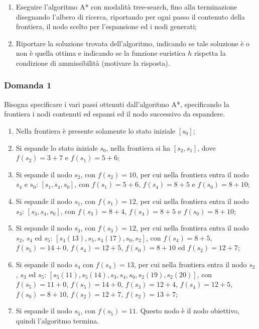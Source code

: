 \documentclass{article}
\numberwithin{equation}{section}
\begin{document}
\begin{enumerate}
    \item Eseguire l'algoritmo A* con modalità tree-search, fino alla terminazione disegnando l'albero di ricerca, riportando per ogni passo il 
contenuto della frontiera, il nodo scelto per l'espansione ed i nodi generati;
    \item Riportare la soluzione trovata dell'algoritmo, indicando se tale soluzione è o non è quella ottima e indicando se la funzione euristica 
$h$ rispetta la condizione di ammissibilità (motivare la risposta). 
\end{enumerate}

\subsubsection*{Domanda 1}

Bisogna specificare i vari passi ottenuti dall'algoritmo A*, specificando la frontiera i nodi contenuti ed espansi ed il nodo successivo 
da espandere.

\begin{enumerate}
    \item Nella frontiera è presente solamente lo stato iniziale $[s_0]$;
    \item Si espande lo stato iniziale $s_0$, nella frontiera si ha $[s_2,s_1]$, dove $f(s_2)=3+7$ e $f(s_1)=5+6$;
    \item Si espande il nodo $s_2$, con $f(s_2)=10$, per cui nella frontiera entra il nodo $s_4$ e $s_0$: $[s_1,s_4, s_0]$, con $f(s_1)=5+6$, $f(s_4)=8+5$ e $f(s_0)=8+10$;
    \item Si espande il nodo $s_1$, con $f(s_1)=12$, per cui nella frontiera entra il nodo $s_3$: $[s_3, s_4, s_0]$, con $f(s_3)=8+4$, $f(s_4)=8+5$ e $f(s_0)=8+10$;
    \item Si espande il nodo $s_3$, con $f(s_3)=12$, per cui nella frontiera entra il nodo $s_2$, $s_4$ ed $s_5$: $[s_4(13), s_5, s_4(17), s_0, s_2]$, con $f(s_4)=8+5$, $f(s_5)=14+0$, $f(s_4)=12+5$, $f(s_0)=8+10$ ed $f(s_2)=12+7$;
    \item Si espande il nodo $s_4$ con $f(s_4)=13$, per cui nella frontiera entra il nodo $s_2$, $s_3$ ed $s_5$: $[s_5(11), s_5(14), s_3, s_4, s_0, s_2(19), s_2(20)]$, con $f(s_5)=11+0$, $f(s_5)=14+0$, $f(s_3)=12+4$, $f(s_4)=12+5$, $f(s_0)=8+10$, $f(s_2)=12+7$, $f(s_2)=13+7$;
    \item Si espande il nodo $s_5$, con $f(s_5)=11$. Questo nodo è il nodo obiettivo, quindi l'algoritmo termina. 
\end{enumerate}
\end{document}
